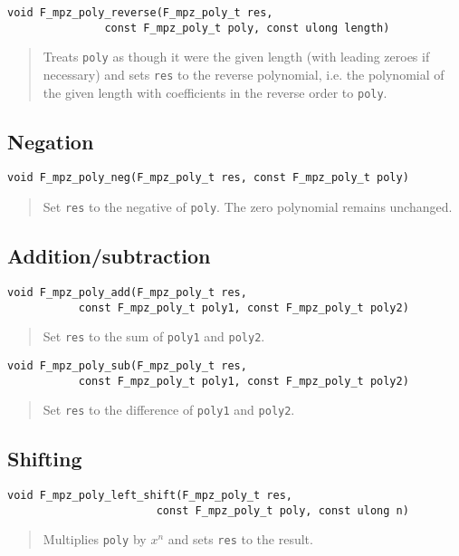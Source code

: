 \documentclass[a4paper,10pt]{article}
\newcommand{\code}{\lstinline}
\begin{document}
\begin{lstlisting}
void F_mpz_poly_reverse(F_mpz_poly_t res, 
               const F_mpz_poly_t poly, const ulong length)
\end{lstlisting}
\begin{quote}
Treats \code{poly} as though it were the given length (with leading zeroes if necessary) and sets 
\code{res} to the reverse polynomial, i.e. the polynomial of the given length with coefficients in
the reverse order to \code{poly}.
\end{quote}

\subsection{Negation}

\begin{lstlisting}
void F_mpz_poly_neg(F_mpz_poly_t res, const F_mpz_poly_t poly)
\end{lstlisting}
\begin{quote}
Set \code{res} to the negative of \code{poly}. The zero polynomial remains unchanged.
\end{quote}

\subsection{Addition/subtraction}

\begin{lstlisting}
void F_mpz_poly_add(F_mpz_poly_t res, 
           const F_mpz_poly_t poly1, const F_mpz_poly_t poly2)
\end{lstlisting}
\begin{quote}
Set \code{res} to the sum of \code{poly1} and \code{poly2}.
\end{quote}

\begin{lstlisting}
void F_mpz_poly_sub(F_mpz_poly_t res, 
           const F_mpz_poly_t poly1, const F_mpz_poly_t poly2)
\end{lstlisting}
\begin{quote}
Set \code{res} to the difference of \code{poly1} and \code{poly2}.
\end{quote}

\subsection{Shifting}

\begin{lstlisting}
void F_mpz_poly_left_shift(F_mpz_poly_t res,
                       const F_mpz_poly_t poly, const ulong n)
\end{lstlisting}
\begin{quote}
Multiplies \code{poly} by $x^n$ and sets \code{res} to the result.
\end{quote}
\end{document}
